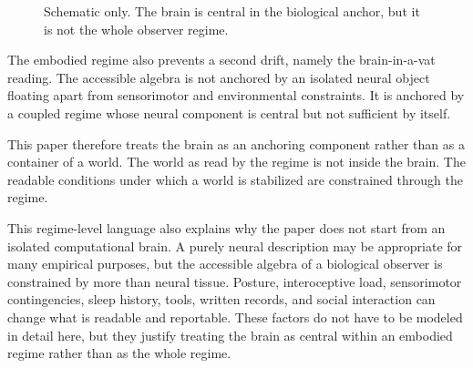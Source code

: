 \documentclass[12pt]{article}
\theoremstyle{definition}
\theoremstyle{remark}
\begin{document}
\begin{figure}[H]
\centering
{}
\caption{Schematic only. The brain is central in the biological anchor,
but it is not the whole observer regime.}
\end{figure}

The embodied regime also prevents a second drift, namely the
brain-in-a-vat reading. The accessible algebra is not anchored by an
isolated neural object floating apart from sensorimotor and
environmental constraints. It is anchored by a coupled regime whose
neural component is central but not sufficient by itself.

This paper therefore treats the brain as an anchoring component rather
than as a container of a world. The world as read by the regime is not
inside the brain. The readable conditions under which a world is
stabilized are constrained through the regime.

This regime-level language also explains why the paper does not start
from an isolated computational brain. A purely neural description may be
appropriate for many empirical purposes, but the accessible algebra of a
biological observer is constrained by more than neural tissue. Posture,
interoceptive load, sensorimotor contingencies, sleep history, tools,
written records, and social interaction can change what is readable and
reportable. These factors do not have to be modeled in detail here, but
they justify treating the brain as central within an embodied regime
rather than as the whole regime.
\end{document}
